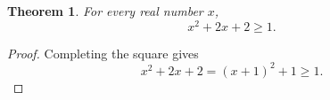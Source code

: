 \documentclass{article}
\newtheorem{theorem}{Theorem}
\begin{document}
\begin{theorem}\label{thm:scope-no-speculation}
For every real number $x$,
\[
  x^2+2x+2\ge 1.
\]
\end{theorem}
\begin{proof}
Completing the square gives
\[
  x^2+2x+2=(x+1)^2+1\ge 1.
\]
\end{proof}
\end{document}
